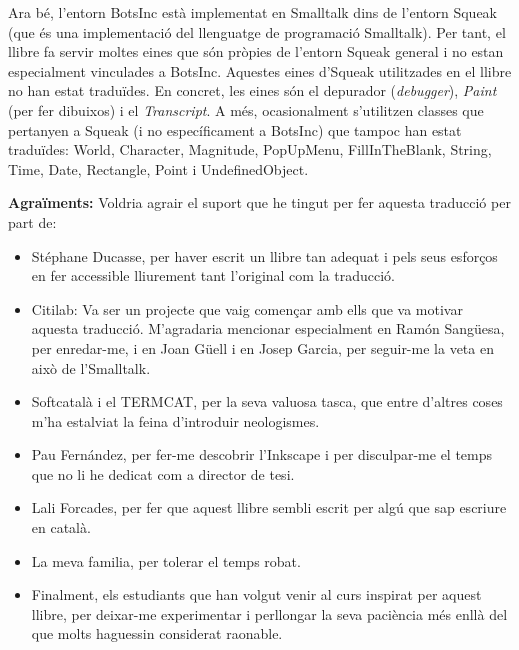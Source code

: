 \vspace*{3mm}

\noindent
Ara bé, l'entorn \textsf{BotsInc} està implementat en Smalltalk dins de l'entorn Squeak (que és una implementació del llenguatge de programació Smalltalk). Per tant, el llibre fa servir moltes eines que són pròpies de l'entorn Squeak general i no estan especialment vinculades a \textsf{BotsInc}. Aquestes eines d'Squeak utilitzades en el llibre no han estat traduïdes. En concret, les eines són el depurador (\emph{debugger}), \emph{Paint} (per fer dibuixos) i el \emph{Transcript}. A més, ocasionalment s'utilitzen classes que pertanyen a Squeak (i no específicament a \textsf{BotsInc}) que tampoc han estat traduïdes: \textsf{World}, \textsf{Character}, \textsf{Magnitude}, \textsf{PopUpMenu}, \textsf{FillInTheBlank}, \textsf{String}, \textsf{Time}, \textsf{Date}, \textsf{Rectangle}, \textsf{Point} i \textsf{UndefinedObject}.

\vspace*{3mm}

\noindent
\textbf{\large Agraïments:}
Voldria agrair el suport que he tingut per fer aquesta traducció per part de:
\begin{itemize}
\item Stéphane Ducasse, per haver escrit un llibre tan adequat i pels seus esforços en fer accessible lliurement tant l'original com la traducció.
\item Citilab: Va ser un projecte que vaig començar amb ells que va motivar aquesta traducció. M'agradaria mencionar especialment en Ramón Sangüesa, per enredar-me, i en Joan Güell i en Josep Garcia, per seguir-me la veta en això de l'Smalltalk.
\item Softcatalà i el TERMCAT, per la seva valuosa tasca, que entre d'altres coses m'ha estalviat la feina d'introduir neologismes.
\item Pau Fernández, per fer-me descobrir l'Inkscape i per disculpar-me el temps que no li he dedicat com a director de tesi.
\item Lali Forcades, per fer que aquest llibre sembli escrit per algú que sap escriure en català.
\item La meva familia, per tolerar el temps robat.
\item Finalment, els estudiants que han volgut venir al curs inspirat per aquest llibre, per deixar-me experimentar i perllongar la seva paciència més enllà del que molts haguessin considerat raonable.
\end{itemize}

